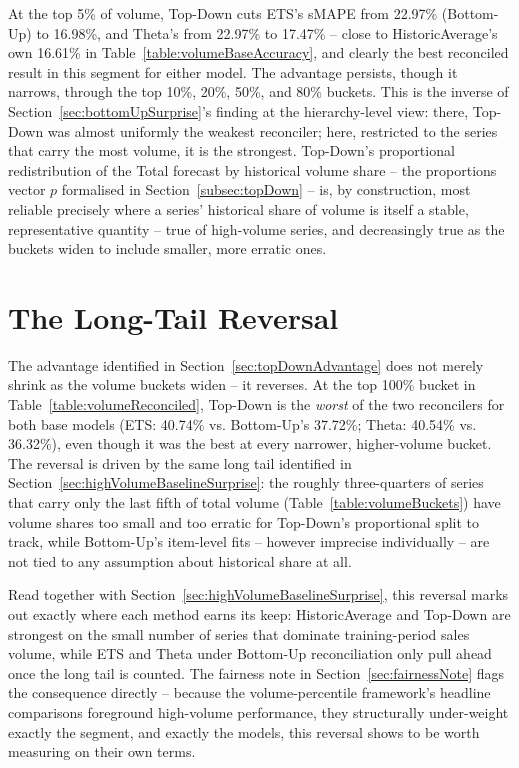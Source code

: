 At the top 5\% of volume, Top-Down cuts ETS's sMAPE from 22.97\% (Bottom-Up) to 16.98\%, and Theta's from 22.97\% to 17.47\% -- close to HistoricAverage's own 16.61\% in Table~\ref{table:volumeBaseAccuracy}, and clearly the best reconciled result in this segment for either model. The advantage persists, though it narrows, through the top 10\%, 20\%, 50\%, and 80\% buckets. This is the inverse of Section~\ref{sec:bottomUpSurprise}'s finding at the hierarchy-level view: there, Top-Down was almost uniformly the weakest reconciler; here, restricted to the series that carry the most volume, it is the strongest. Top-Down's proportional redistribution of the Total forecast by historical volume share -- the proportions vector $p$ formalised in Section~\ref{subsec:topDown} -- is, by construction, most reliable precisely where a series' historical share of volume is itself a stable, representative quantity -- true of high-volume series, and decreasingly true as the buckets widen to include smaller, more erratic ones.

\section{The Long-Tail Reversal}
\label{sec:longTailReversal}

The advantage identified in Section~\ref{sec:topDownAdvantage} does not merely shrink as the volume buckets widen -- it reverses. At the top 100\% bucket in Table~\ref{table:volumeReconciled}, Top-Down is the \emph{worst} of the two reconcilers for both base models (ETS: 40.74\% vs. Bottom-Up's 37.72\%; Theta: 40.54\% vs. 36.32\%), even though it was the best at every narrower, higher-volume bucket. The reversal is driven by the same long tail identified in Section~\ref{sec:highVolumeBaselineSurprise}: the roughly three-quarters of series that carry only the last fifth of total volume (Table~\ref{table:volumeBuckets}) have volume shares too small and too erratic for Top-Down's proportional split to track, while Bottom-Up's item-level fits -- however imprecise individually -- are not tied to any assumption about historical share at all.

Read together with Section~\ref{sec:highVolumeBaselineSurprise}, this reversal marks out exactly where each method earns its keep: HistoricAverage and Top-Down are strongest on the small number of series that dominate training-period sales volume, while ETS and Theta under Bottom-Up reconciliation only pull ahead once the long tail is counted. The fairness note in Section~\ref{sec:fairnessNote} flags the consequence directly -- because the volume-percentile framework's headline comparisons foreground high-volume performance, they structurally under-weight exactly the segment, and exactly the models, this reversal shows to be worth measuring on their own terms.

